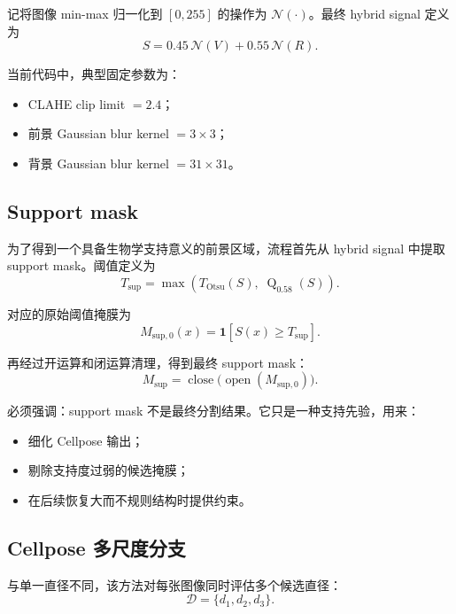 \documentclass[11pt]{article}
\newcommand{\1}{\mathbf{1}}
\newcommand{\quantile}{\operatorname{Q}}
\newcommand{\openop}{\operatorname{open}}
\newcommand{\closeop}{\operatorname{close}}
\newcommand{\normminmax}{\mathcal{N}}
\newcommand{\support}{M_{\mathrm{sup}}}
\newcommand{\signal}{S}
\begin{document}
记将图像 min-max 归一化到 $[0,255]$ 的操作为 $\normminmax(\cdot)$。最终 hybrid signal 定义为
\begin{equation}
\signal = 0.45\,\normminmax(V) + 0.55\,\normminmax(R).
\end{equation}

当前代码中，典型固定参数为：
\begin{itemize}[leftmargin=1.5em]
  \item CLAHE clip limit $=2.4$；
  \item 前景 Gaussian blur kernel $=3\times3$；
  \item 背景 Gaussian blur kernel $=31\times31$。
\end{itemize}

\subsection{Support mask}
为了得到一个具备生物学支持意义的前景区域，流程首先从 hybrid signal 中提取 support mask。阈值定义为
\begin{equation}
T_{\mathrm{sup}} = \max\left(T_{\mathrm{Otsu}}(\signal),\; \quantile_{0.58}(\signal)\right).
\end{equation}

对应的原始阈值掩膜为
\begin{equation}
M_{\mathrm{sup},0}(x)=\1[\signal(x)\ge T_{\mathrm{sup}}].
\end{equation}

再经过开运算和闭运算清理，得到最终 support mask：
\begin{equation}
\support = \closeop\bigl(\openop(M_{\mathrm{sup},0})\bigr).
\end{equation}

必须强调：support mask 不是最终分割结果。它只是一种支持先验，用来：
\begin{itemize}[leftmargin=1.5em]
  \item 细化 Cellpose 输出；
  \item 剔除支持度过弱的候选掩膜；
  \item 在后续恢复大而不规则结构时提供约束。
\end{itemize}

\subsection{Cellpose 多尺度分支}
与单一直径不同，该方法对每张图像同时评估多个候选直径：
\begin{equation}
\mathcal{D} = \{d_1,d_2,d_3\}.
\end{equation}
\end{document}
